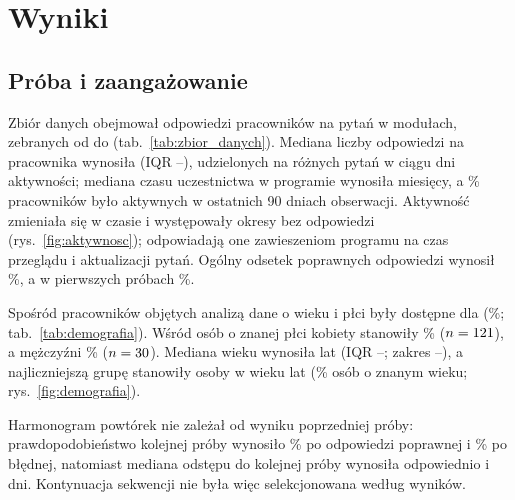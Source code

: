 \section{Wyniki}

\subsection{Próba i zaangażowanie}
Zbiór danych obejmował \NResponses{} odpowiedzi \NEmployees{} pracowników na \NItems{} pytań
w \NModules{} modułach, zebranych od \DateStart{} do \DateEnd{} (tab.~\ref{tab:zbior_danych}).
Mediana liczby odpowiedzi na pracownika wynosiła \RespPerEmpMedian{} (IQR
\RespPerEmpQOne--\RespPerEmpQThree), udzielonych na \ItemsPerEmpMedian{} różnych pytań w ciągu
\ActiveDaysMedian{} dni aktywności; mediana czasu uczestnictwa w programie wynosiła
\SpanMonthsMedian{} miesięcy, a \ActiveLastQuarterPct\% pracowników było aktywnych w ostatnich
90 dniach obserwacji. Aktywność zmieniała się w czasie i występowały okresy bez odpowiedzi
(rys.~\ref{fig:aktywnosc}); odpowiadają one zawieszeniom programu na czas przeglądu i aktualizacji
pytań. Ogólny odsetek poprawnych odpowiedzi wynosił \AccOverall\%, a w pierwszych próbach \AccFirst\%.

Spośród \DemoN{} pracowników objętych analizą dane o wieku i płci były dostępne dla \DemoMatched{}
(\DemoMatchedPct\%; tab.~\ref{tab:demografia}). Wśród osób o znanej płci kobiety stanowiły
\DemoWomenPct\% ($n = 121$), a mężczyźni \DemoMenPct\% ($n = 30$). Mediana wieku wynosiła
\AgeMedian{} lat (IQR \AgeQOne--\AgeQThree; zakres \AgeMin--\AgeMax), a najliczniejszą grupę stanowiły
osoby w wieku \AgeModalGroup{} lat (\AgeModalGroupPct\% osób o znanym wieku; rys.~\ref{fig:demografia}).

Harmonogram powtórek nie zależał od wyniku poprzedniej próby: prawdopodobieństwo kolejnej próby
wynosiło \ReaskAfterCorrect\% po odpowiedzi poprawnej i \ReaskAfterIncorrect\% po błędnej, natomiast mediana
odstępu do kolejnej próby wynosiła odpowiednio \GapAfterCorrect{} i \GapAfterIncorrect{} dni. Kontynuacja
sekwencji nie była więc selekcjonowana według wyników. %

